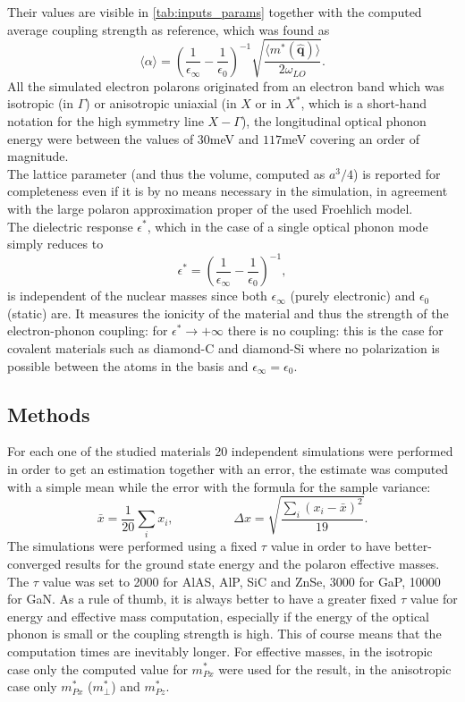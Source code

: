 Their values are visible in \ref{tab:inputs_params} together with the computed average coupling strength as reference, which was found as 
\begin{equation}
    \langle\alpha\rangle=\left(\frac{1}{\epsilon_\infty}-\frac{1}{\epsilon_0}\right)^{-1}\sqrt{\frac{\langle m^*(\hat{\mathbf{q}})\rangle}{2\omega_{LO}}}.
\end{equation}
All the simulated electron polarons originated from an electron band which was isotropic (in $\Gamma$) or anisotropic uniaxial (in $X$ or in $X^*$, which is a short-hand notation for the high symmetry line
$X-\Gamma$), the longitudinal optical phonon energy were between the values of $30$meV and $117$meV covering an order of magnitude.\\
The lattice parameter (and thus the volume, computed as $a^3/4$) is reported for completeness even if it is by no means necessary in the simulation, in agreement 
with the large polaron approximation proper of the used Froehlich model.\\
The dielectric response $\epsilon^*$, which in the case of a single optical phonon mode simply reduces to 
\begin{equation}
    \epsilon^*=\left(\frac{1}{\epsilon_\infty}-\frac{1}{\epsilon_0}\right)^{-1},
\end{equation}
is independent of the nuclear masses since both $\epsilon_\infty$ (purely electronic) and $\epsilon_0$ (static) are. It measures the ionicity of the material and thus 
the strength of the electron-phonon coupling: for $\epsilon^*\to+\infty$ there is no coupling: this is the case for covalent materials such as diamond-C and diamond-Si where 
no polarization is possible between the atoms in the basis and $\epsilon_\infty=\epsilon_0$.
\subsection{Methods}
For each one of the studied materials 20 independent simulations were performed in order to get an estimation together with an error, 
the estimate was computed with a simple mean while the error with the formula for the sample variance:
\begin{equation}
    \bar{x}=\frac{1}{20}\sum_i x_i,\hspace{2cm}\Delta x=\sqrt{\frac{\sum_i\left(x_i-\bar{x}\right)^2}{19}}.
\end{equation}
The simulations were performed using a fixed $\tau$ value in order to have better-converged results for the ground state energy and the polaron 
effective masses. The $\tau$ value was set to 2000 for AlAS, AlP, SiC and ZnSe, 3000 for GaP, 10000 for GaN. As a rule of thumb, it is always better 
to have a greater fixed $\tau$ value for energy and effective mass computation, especially if the energy of the optical phonon is small or the coupling strength is high. This 
of course means that the computation times are inevitably longer.
For effective masses, in the isotropic case only the computed value for $m^*_{Px}$ were used for the result, in the anisotropic case only $m^*_{Px}$ ($m^*_\perp$) and $m^*_{Pz}$.
